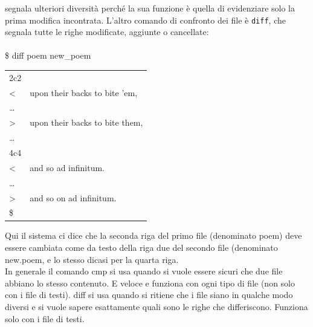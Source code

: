 segnala ulteriori diversità perché la sua funzione è quella di evidenziare solo la prima
modifica incontrata.
L'altro comando di confronto dei file è \texttt{diff}, che segnala tutte le righe modificate,
aggiunte o cancellate:\\\\
\$ diff poem new\_poem\\
\begin{tabular}{ll}
	2c2\\
	<& upon their backs to bite 'em,\\
	\dots&\\
	>&upon their backs to bite them,\\
	\dots \\
	4c4\\
	<&and so ad infinitum.\\
	\dots\\
	>& and so on ad infinitum.\\
	\$
\end{tabular}
Qui il sistema ci dice che la seconda riga del primo file (denominato poem) deve essere
cambiata come da testo della riga due del secondo file (denominato new.poem, e lo
stesso dicasi per la quarta riga.\\
In generale il comando cmp si usa quando si vuole essere sicuri che due file abbiano
lo stesso contenuto. E veloce e funziona con ogni tipo di file (non solo con i file di testi). diff si usa quando si ritiene che i file siano in qualche modo diversi e si vuole sapere esattamente quali sono le righe che differiscono. Funziona solo con i file di testi.

